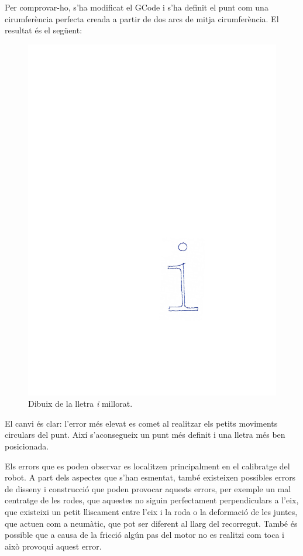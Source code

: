 \begin{itemize}
	Per comprovar-ho, s'ha modificat el GCode i s'ha definit el punt com una cirumferència perfecta creada a partir de dos arcs de mitja cirumferència. El resultat és el següent:
	\begin{figure}[H]
		\centering
		\includegraphics{resultatLletra2}
		\caption{Dibuix de la lletra \textit{i} millorat.}
		\label{fig:Lletra2}
	\end{figure}
	El canvi és clar: l'error més elevat es comet al realitzar els petits moviments circulars del punt. Així s'aconsegueix un punt més definit i una lletra més ben posicionada.
	
	Els errors que es poden observar es localitzen principalment en el calibratge del robot. A part dels aspectes que s'han esmentat, també existeixen possibles errors de disseny i construcció que poden provocar aquests errors, per exemple un mal centratge de les rodes, que aquestes no siguin perfectament perpendiculars a l'eix, que existeixi un petit lliscament entre l'eix i la roda o la deformació de les juntes, que actuen com a neumàtic, que pot ser diferent al llarg del recorregut. També és possible que a causa de la fricció algún pas del motor no es realitzi com toca i això provoqui aquest error.  
	

\end{itemize}
